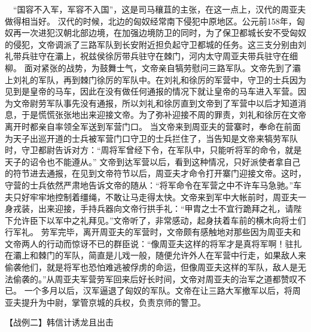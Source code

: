 \documentclass[a4paper,12pt,UTF8,twoside]{ctexbook}
\begin{document}
　“国容不入军，军容不入国”，这是司马穰苴的主张，在这一点上，汉代的周亚夫做得相当好。
汉代的时候，北边的匈奴经常南下侵犯中原地区。公元前158年，匈奴再一次进犯汉朝北部边境，在加强边境防卫的同时，为了保卫都城长安不受匈奴的侵犯，文帝调派了三路军队到长安附近担负起守卫都城的任务。这三支分别由刘礼带兵驻守在灞上，祝兹侯徐厉带兵驻守在棘门，河内太守周亚夫带兵驻守在细柳。
面对紧张的战势，为鼓舞士气，文帝亲自犒劳慰问三路军队。文帝先到了灞上刘礼的军队，再到棘门徐厉的军队中。在刘礼和徐厉的军营中，守卫的士兵因为见到是皇帝的马车，因此在没有做任何通报的情况下就让皇帝的马车进入军营。因为文帝尉劳军队事先没有通报，所以刘礼和徐厉直到文帝到了军营中以后才知道消息，于是慌慌张张地出来迎接文帝。为了弥补迎接不周的罪责，刘礼和徐厉在文帝离开时都亲自率领全军送到军营门口。
当文帝来到周亚夫的营寨时，奉命在前面为天子出巡开道的士兵被军营门口守卫的士兵拦住了，当告知是文帝来犒劳军队时，守卫都尉告诉对方：“周将军曾经下令，在军队中，只能听将军的命令，就是天子的诏令也不能遵从。”
文帝到达军营以后，看到这种情况，只好派使者拿自己的符节进去通报，在见到文帝符节以后，周亚夫才命令打开寨门迎接文帝。这时，守营的士兵依然严肃地告诉文帝的随从：“将军命令在军营之中不许车马急驰。”车夫只好牢牢地控制着缰绳，不敢让马走得太快。文帝来到军中大帐前时，周亚夫一身戎装，出来迎接，手持兵器向文帝行拱手礼：“甲胄之士不宜行跪拜之礼，请陛下允许臣下以军中之礼拜见。”文帝听了，非常感动，起身扶着车前的横木向将士们行军礼。
劳军完毕，离开周亚夫的军营时，文帝颇有感触地对那些因为周亚夫和文帝两人的行动而惊讶不已的群臣说：“像周亚夫这样的将军才是真将军啊！驻扎在灞上和棘门的军队，简直是儿戏一般，随便允许外人在军营中行走，如果敌人来偷袭他们，就是将军也恐怕难逃被俘虏的命运，但像周亚夫这样的军队，敌人是无法偷袭的。”从周亚夫军营劳军回来后好长时间，文帝对周亚夫的治军之道都赞叹不已。
一个多月以后，汉军逼退了匈奴的军队。文帝在让三路大军撤军以后，将周亚夫提升为中尉，掌管京城的兵权，负责京师的警卫。


【战例二】韩信计诱龙且出击
\end{document}
